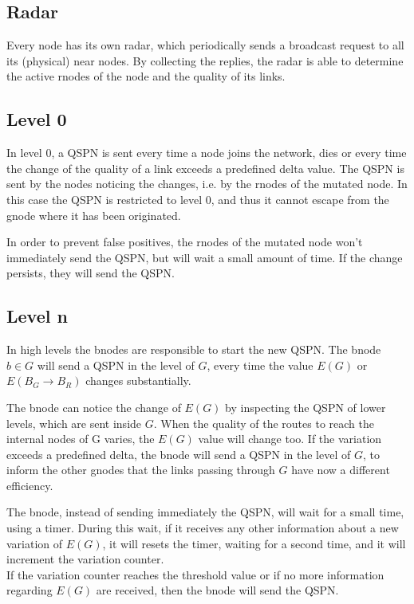 \documentclass[a4paper]{article}
\begin{document}
\subsection{Radar}
Every node has its own radar, which periodically sends a broadcast request to
all its (physical) near nodes. By collecting the replies, the radar is able to
determine the active rnodes of the node and the quality of its links.

\subsection{Level 0}
In level 0, a QSPN is sent every time a node joins the network, dies or every
time the change of the quality of a link exceeds a predefined delta value.
The QSPN is sent by the nodes noticing the changes, i.e. by the rnodes of the
mutated node. In this case the QSPN is restricted to level 0, and thus it cannot
escape from the gnode where it has been originated.

In order to prevent false positives, the rnodes of the mutated node won't
immediately send the QSPN, but will wait a small amount of time. If the change
persists, they will send the QSPN.

\subsection{Level n}
In high levels the bnodes are responsible to start the new QSPN.
The bnode $b \in G$ will send a QSPN in the level of $G$, every time the value
$E(G)$ or\\$E(B_G\rightarrow B_R)$ changes substantially.

The bnode can notice the change of $E(G)$ by inspecting the QSPN of lower
levels, which are sent inside $G$.
When the quality of the routes to reach the internal nodes of G varies, the $E(G)$
value will change too. If the variation exceeds a predefined delta, the bnode
will send a QSPN in the level of $G$, to inform the other gnodes that the links
passing through $G$ have now a different efficiency.

The bnode, instead of sending immediately the QSPN, will wait for a small
time, using a timer. During this wait, if it receives any other information about a
new variation of $E(G)$, it will resets the timer, waiting for a second time,
and it will increment the variation counter.\\
If the variation counter reaches the threshold value or if no more information
regarding $E(G)$ are received, then the bnode will send the QSPN.
\end{document}
